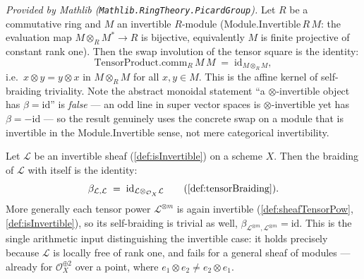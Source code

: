 \begin{lemma}
  \label{lem:tensorProductComm_eq_refl_mathlib}
  \mathlibok
  \textit{Provided by Mathlib (\texttt{Mathlib.RingTheory.PicardGroup}).}
  Let \(R\) be a commutative ring and \(M\) an invertible \(R\)-module
  (\(\mathrm{Module.Invertible}\,R\,M\): the evaluation map
  \(M \otimes_R M^{\ast} \to R\) is bijective, equivalently \(M\) is finite
  projective of constant rank one). Then the swap involution of the tensor square
  is the identity:
  \[
    \mathrm{TensorProduct.comm}_R\,M\,M \;=\;
      \mathrm{id}_{M \otimes_R M},
  \]
  i.e.\ \(x \otimes y = y \otimes x\) in \(M \otimes_R M\) for all
  \(x, y \in M\). This is the affine kernel of self-braiding triviality. Note the
  abstract monoidal statement ``a \(\otimes\)-invertible object has
  \(\beta = \mathrm{id}\)'' is \emph{false} --- an odd line in super vector spaces
  is \(\otimes\)-invertible yet has \(\beta = -\mathrm{id}\) --- so the result
  genuinely uses the concrete swap on a module that is invertible in the
  \(\mathrm{Module.Invertible}\) sense, not mere categorical invertibility.
\end{lemma}

\begin{lemma}\leanok
  \label{lem:braiding_eq_id_of_invertible}
  Let \(\mathcal{L}\) be an invertible sheaf (\cref{def:isInvertible}) on a scheme
  \(X\). Then the braiding of \(\mathcal{L}\) with itself is the identity:
  \[
    \beta_{\mathcal{L},\mathcal{L}} \;=\;
      \mathrm{id}_{\mathcal{L} \otimes_{\mathcal{O}_X} \mathcal{L}}
    \qquad(\cref{def:tensorBraiding}).
  \]
  More generally each tensor power \(\mathcal{L}^{\otimes m}\) is again invertible
  (\cref{def:sheafTensorPow}, \cref{def:isInvertible}), so its self-braiding is
  trivial as well, \(\beta_{\mathcal{L}^{\otimes m},\mathcal{L}^{\otimes m}} =
  \mathrm{id}\). This is the single arithmetic input distinguishing the invertible
  case: it holds precisely because \(\mathcal{L}\) is locally free of rank one, and
  fails for a general sheaf of modules --- already for
  \(\mathcal{O}_X^{\oplus 2}\) over a point, where
  \(e_1 \otimes e_2 \neq e_2 \otimes e_1\).
\end{lemma}


